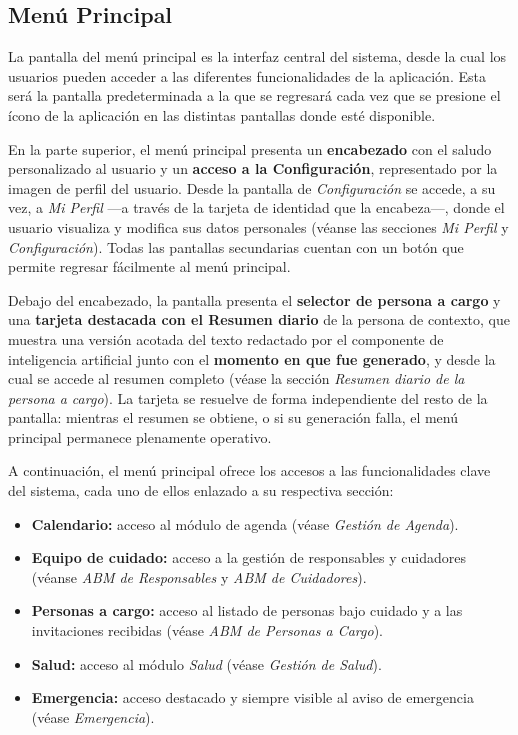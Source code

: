 \documentclass[a4paper,12pt]{article}
\begin{document}
    \subsection{Menú Principal}
    \par La pantalla del menú principal es la interfaz central del sistema, desde la cual los usuarios pueden acceder a las diferentes funcionalidades de la aplicación. Esta será la pantalla predeterminada a la que se regresará cada vez que se presione el ícono de la aplicación en las distintas pantallas donde esté disponible.
    \par En la parte superior, el menú principal presenta un \textbf{encabezado} con el saludo personalizado al usuario y un \textbf{acceso a la Configuración}, representado por la imagen de perfil del usuario. Desde la pantalla de \textit{Configuración} se accede, a su vez, a \textit{Mi Perfil} —a través de la tarjeta de identidad que la encabeza—, donde el usuario visualiza y modifica sus datos personales (véanse las secciones \textit{Mi Perfil} y \textit{Configuración}). Todas las pantallas secundarias cuentan con un botón que permite regresar fácilmente al menú principal.
    \par Debajo del encabezado, la pantalla presenta el \textbf{selector de persona a cargo} y una \textbf{tarjeta destacada con el Resumen diario} de la persona de contexto, que muestra una versión acotada del texto redactado por el componente de inteligencia artificial junto con el \textbf{momento en que fue generado}, y desde la cual se accede al resumen completo (véase la sección \textit{Resumen diario de la persona a cargo}). La tarjeta se resuelve de forma independiente del resto de la pantalla: mientras el resumen se obtiene, o si su generación falla, el menú principal permanece plenamente operativo.
    \par A continuación, el menú principal ofrece los accesos a las funcionalidades clave del sistema, cada uno de ellos enlazado a su respectiva sección:
    \begin{itemize}
        \item \textbf{Calendario:} acceso al módulo de agenda (véase \textit{Gestión de Agenda}).
        \item \textbf{Equipo de cuidado:} acceso a la gestión de responsables y cuidadores (véanse \textit{ABM de Responsables} y \textit{ABM de Cuidadores}).
        \item \textbf{Personas a cargo:} acceso al listado de personas bajo cuidado y a las invitaciones recibidas (véase \textit{ABM de Personas a Cargo}).
        \item \textbf{Salud:} acceso al módulo \textit{Salud} (véase \textit{Gestión de Salud}).
        \item \textbf{Emergencia:} acceso destacado y siempre visible al aviso de emergencia (véase \textit{Emergencia}).
    \end{itemize}
\end{document}
